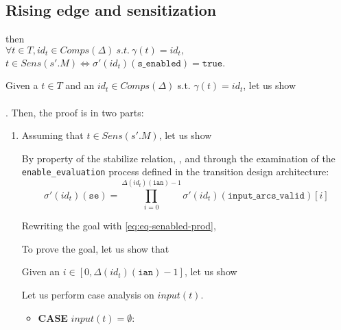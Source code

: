 \documentclass[dvipsnames,12pt]{article}
\begin{document}
\subsection{Rising edge and sensitization}
\label{sec:re-sens}

\begin{lemma}
  \label{lem:re-equal-sens}
  \rehyps{} then\\
  $\forall{}t\in{}T,id_t\in{}Comps(\Delta)~s.t.~\gamma(t)=id_t,$
  $t\in{}Sens(s'.M)\Leftrightarrow\sigma'(id_t)(\texttt{s\_enabled})=\mathtt{true}$.
\end{lemma}

\begin{niproof}
  Given a $t\in{}T$ and an $id_t\in{}Comps(\Delta)$
  s.t. $\gamma(t)=id_t$, let us show\\
  \\
  
  \exT{}. Then, the proof is in two parts:

  \begin{enumerate}
  \item Assuming that $t\in{}Sens(s'.M)$, let us show

    \noindent{}By property of the stabilize relation, \InCsCompT{},
    and through the examination of the \texttt{enable_evaluation}
    process defined in the transition design architecture:
    \begin{equation}
      \sigma'(id_t)(\texttt{se})=\prod\limits_{i=0}^{\Delta(id_t)(\texttt{ian})-1}\sigma'(id_t)(\texttt{input\_arcs\_valid})[i]\label{eq:eq-senabled-prod}
    \end{equation}

    Rewriting the goal with \eqref{eq:eq-senabled-prod},
    
    \noindent{}To prove the goal, let us show that

    \noindent{}Given an $i\in[0,\Delta(id_t)(\texttt{ian})-1]$, let us show
    
    \noindent{}Let us perform case analysis on $input(t)$.

    \begin{itemize}
    \item \textbf{CASE} $input(t)=\emptyset$:


\end{itemize}
\end{enumerate}
\end{niproof}
\end{document}
